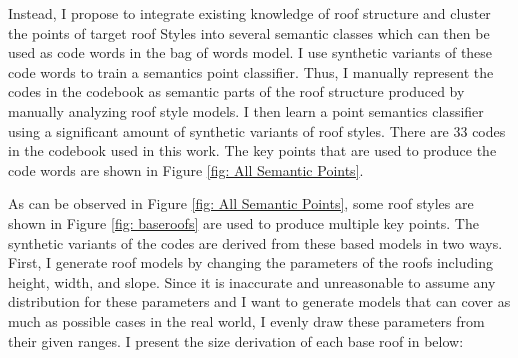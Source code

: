\documentclass{iitthesis}
\begin{document}
Instead, I propose to integrate existing knowledge of roof structure and cluster the points of target roof
Styles into several semantic classes which can then be used as code words in the bag of words model. I use synthetic variants of these code words to train a semantics point classifier. Thus, I manually represent the codes in the codebook as semantic parts of the roof structure produced by manually analyzing roof style models. I then learn a point semantics classifier using a significant amount of synthetic variants of roof styles. There are 33 codes in the codebook used in this work. The key points that are used to produce the code words are shown in Figure \ref{fig: All Semantic Points}. 

As can be observed in Figure \ref{fig: All Semantic Points}, some roof styles are shown in Figure \ref{fig: baseroofs} are used to produce multiple key points. The synthetic variants of the codes are derived from these based models in two ways. First, I generate roof models by changing the parameters of the roofs including height, width, and slope. Since it is inaccurate and unreasonable to assume any distribution for these parameters and I want to generate models that can cover as much as possible cases in the real world, I evenly draw these parameters from their given ranges. I present the size derivation of each base roof in below:
\end{document}
